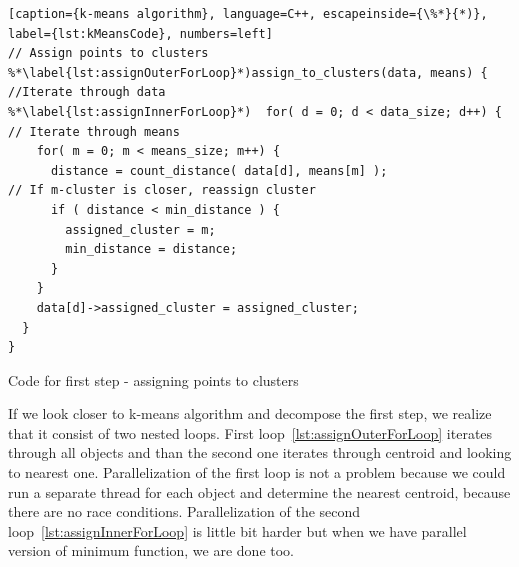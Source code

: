 \begin{Code}
    \centering
\begin{lstlisting}[caption={k-means algorithm}, language=C++, escapeinside={\%*}{*)}, label={lst:kMeansCode}, numbers=left]
// Assign points to clusters
%*\label{lst:assignOuterForLoop}*)assign_to_clusters(data, means) {
//Iterate through data
%*\label{lst:assignInnerForLoop}*)  for( d = 0; d < data_size; d++) {
// Iterate through means
    for( m = 0; m < means_size; m++) {
      distance = count_distance( data[d], means[m] );
// If m-cluster is closer, reassign cluster
      if ( distance < min_distance ) {
        assigned_cluster = m;
        min_distance = distance;
      }
    }
    data[d]->assigned_cluster = assigned_cluster;
  }
}
\end{lstlisting}
    \caption{Code for first step - assigning points to clusters}
\end{Code}

If we look closer to k-means algorithm and decompose the first step, we realize that it consist of two nested  loops. First loop~\autoref{lst:assignOuterForLoop} iterates through all objects and than the second one iterates through centroid and looking to nearest one. Parallelization of the first loop is not a problem because we could run a separate thread for each object and determine the nearest centroid, because there are no race conditions. Parallelization of the second loop~\autoref{lst:assignInnerForLoop} is little bit harder but when we have parallel version of minimum function, we are done too.\\

